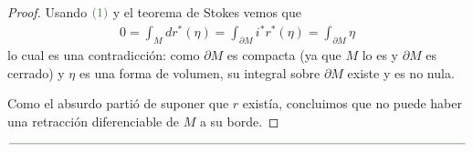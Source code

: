 \documentclass[11pt]{article}
\newcommand{\paint}[1]{\color{color}{#1}}
\begin{document}
\begin{proof}
Usando $\paint{(1)}$ y el teorema de Stokes vemos que
\begin{align*}
0 = \int_M dr^*(\eta) = \int_{\partial M}i^*r^*(\eta) = \int_{\partial M} \eta
\end{align*}
lo cual es una contradicción: como $\partial M$ es compacta (ya que $M$ lo es y $\partial M$ es cerrado) y $\eta$ es una forma de volumen, su integral sobre $\partial M$ existe y es no nula. 

Como el absurdo partió de suponer que $r$ existía, concluimos que no puede haber una retracción diferenciable de $M$ a su borde.
\end{proof}

\begin{center}
$\paint{
\rule{400pt}{0.5pt}
}$
\vspace{10pt}
\end{center}
\end{document}
